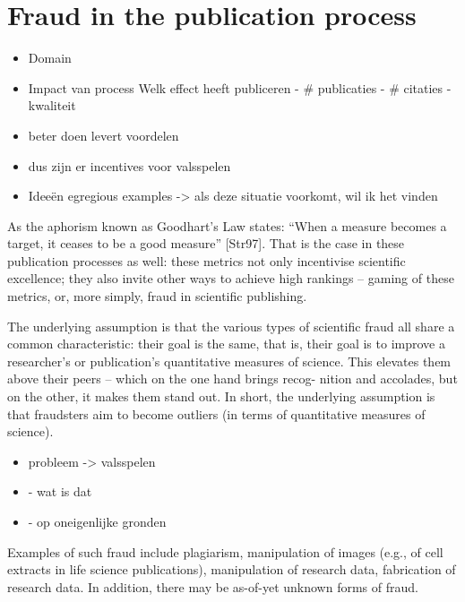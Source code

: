 \documentclass{ou-report}
\newcommand{\outline}[1]{{\color{blue} #1}}
\begin{document}

\section{Fraud in the publication process}
\outline{
\begin{itemize}
    \item Domain
    \item Impact van process Welk effect heeft publiceren
    - \# publicaties
    - \# citaties
    - kwaliteit
    \item beter doen levert voordelen
    \item dus zijn er incentives voor valsspelen
    \item Idee\"en egregious examples -> als deze situatie voorkomt, wil ik 
    het vinden
\end{itemize}
}
As the aphorism known as Goodhart’s Law states: “When a measure becomes a 
target, it ceases to be a good measure” [Str97]. That is the case in these 
publication processes as well: these metrics not only incentivise scientific 
excellence; they also invite other ways to achieve high rankings – gaming of 
these metrics, or, more simply, fraud in scientific publishing. 

The underlying assumption is
that the various types of scientific fraud all share a common characteristic: their goal is the
same, that is, their goal is to improve a researcher’s or publication’s quantitative measures
of science. This elevates them above their peers – which on the one hand brings recog-
nition and accolades, but on the other, it makes them stand out. In short, the underlying
assumption is that fraudsters aim to become outliers (in terms of quantitative measures of
science).


\outline{
\begin{itemize}
    \item probleem -> valsspelen
    \item - wat is dat
    \item - op oneigenlijke gronden
\end{itemize}
}
Examples of such fraud include plagiarism, manipulation of images (e.g., of cell 
extracts in life science publications), manipulation of research data, 
fabrication of research data. In addition, there may be as-of-yet unknown forms 
of fraud.
\end{document}

